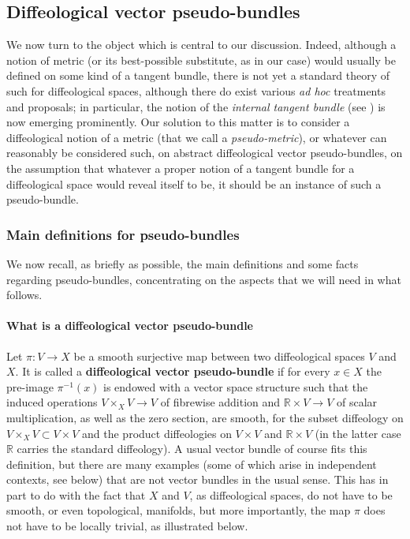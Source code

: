 \documentclass{article}
\newcommand\matR{{\mathbb{R}}}
\begin{document}
\subsection{Diffeological vector pseudo-bundles}

We now turn to the object which is central to our discussion. Indeed, although a notion of metric (or its best-possible substitute, as in our case) would usually be defined on some kind of a tangent bundle, 
there is not yet a standard theory of such for diffeological spaces, although there do exist various \emph{ad hoc} treatments and proposals; in particular, the notion of the \emph{internal tangent bundle} (see 
\cite{CWtangent}) is now emerging prominently. Our solution to this matter is to consider a diffeological notion of a metric (that we call a \emph{pseudo-metric}), or whatever can reasonably be considered such, 
on abstract diffeological vector pseudo-bundles, on the assumption that whatever a proper notion of a tangent bundle for a diffeological space would reveal itself to be, it should be an instance of such a 
pseudo-bundle.


\subsubsection{Main definitions for pseudo-bundles}

We now recall, as briefly as possible, the main definitions and some facts regarding pseudo-bundles, concentrating on the aspects that we will need in what follows.

\paragraph{What is a diffeological vector pseudo-bundle} Let $\pi:V\to X$ be a smooth surjective map between two diffeological spaces $V$ and $X$. It is called a \textbf{diffeological vector pseudo-bundle}
if for every $x\in X$ the pre-image $\pi^{-1}(x)$ is endowed with a vector space structure such that the induced operations $V\times_X V\to V$ of fibrewise addition and $\matR\times V\to V$ of scalar
multiplication, as well as the zero section, are smooth, for the subset diffeology on $V\times_X V\subset V\times V$ and the product diffeologies on $V\times V$ and $\matR\times V$ (in the latter case
$\matR$ carries the standard diffeology). A usual vector bundle of course fits this definition, but there are many examples (some of which arise in independent contexts, see below) that are not vector
bundles in the usual sense. This has in part to do with the fact that $X$ and $V$, as diffeological spaces, do not have to be smooth, or even topological, manifolds, but more importantly, the map $\pi$
does not have to be locally trivial, as illustrated below.
\end{document}
